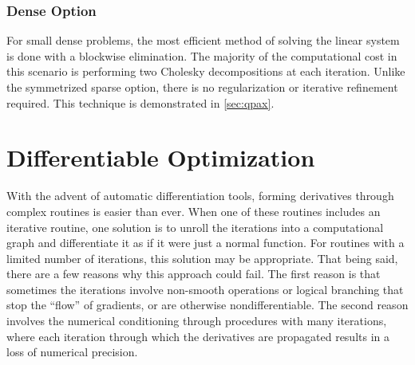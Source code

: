 \subsubsection{Dense Option}
For small dense problems, the most efficient method of solving the linear system is done with a blockwise elimination. The majority of the computational cost in this scenario is performing two Cholesky decompositions at each iteration. Unlike the symmetrized sparse option, there is no regularization or iterative refinement required. This technique is demonstrated in \ref{sec:qpax}.
%
%
\section{Differentiable Optimization}
%
%
With the advent of automatic differentiation tools, forming derivatives through complex routines is easier than ever. When one of these routines includes an iterative routine, one solution is to unroll the iterations into a computational graph and differentiate it as if it were just a normal function. For routines with a limited number of iterations, this solution may be appropriate. That being said, there are a few reasons why this approach could fail. The first reason is that sometimes the iterations involve non-smooth operations or logical branching that stop the ``flow'' of gradients, or are otherwise nondifferentiable. The second reason involves the numerical conditioning through procedures with many iterations, where each iteration through which the derivatives are propagated results in a loss of numerical precision. 
%
%
